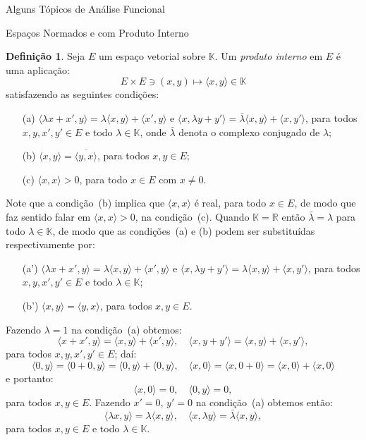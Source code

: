 \documentclass[oneside,final,11pt]{amsbook}
\newcommand{\R}{\mathds R}
\newcommand{\K}{\mathds K}
\theoremstyle{remark}\newtheorem{exercise}{Exercício}[chapter]
\theoremstyle{remark}\newtheorem{*exercise}[exercise]{\hbox to 0pt{\hskip 0pt minus 1fil*}Exercício}
\theoremstyle{definition}\newtheorem{exdefin}{Definição}[chapter]
\theoremstyle{plain}\newtheorem{teo}{Teorema}[section]
\theoremstyle{plain}\newtheorem{lem}[teo]{Lema}
\theoremstyle{plain}\newtheorem{prop}[teo]{Proposição}
\theoremstyle{plain}\newtheorem{cor}[teo]{Corolário}
\theoremstyle{definition}\newtheorem{defin}[teo]{Definição}
\theoremstyle{remark}\newtheorem{rem}[teo]{Observação}
\theoremstyle{definition}\newtheorem{notation}[teo]{Notação}
\theoremstyle{definition}\newtheorem{convention}[teo]{Convenção}
\theoremstyle{definition}\newtheorem{example}[teo]{Exemplo}
\numberwithin{section}{chapter}
\numberwithin{equation}{section}
\begin{document}
\begin{chapter}{Alguns Tópicos de Análise Funcional}
\begin{section}{Espaços Normados e com Produto Interno}
\begin{defin}
Seja $E$ um espaço vetorial sobre $\K$. Um {\em produto interno\/} em $E$ é uma
aplicação:\index[simbolos]{$\langle\cdot,\cdot\rangle$}
\[E\times E\ni(x,y)\longmapsto\langle x,y\rangle\in\K\]
satisfazendo as seguintes condições:
\begin{itemize}
\item[(a)] $\langle\lambda x+x',y\rangle=\lambda\langle x,y\rangle+\langle x',y\rangle$
e $\langle x,\lambda y+y'\rangle=\bar\lambda\langle x,y\rangle+\langle x,y'\rangle$, para todos
$x,y,x',y'\in E$ e todo $\lambda\in\K$, onde $\bar\lambda$ denota o complexo conjugado de $\lambda$;
\item[(b)] $\langle x,y\rangle=\overline{\langle y,x\rangle}$, para todos $x,y\in E$;
\item[(c)] $\langle x,x\rangle>0$, para todo $x\in E$ com $x\ne0$.
\end{itemize}
\end{defin}
Note que a condição~(b) implica que $\langle x,x\rangle$ é real, para todo $x\in E$, de modo que faz sentido
falar em $\langle x,x\rangle>0$, na condição~(c). Quando $\K=\R$ então $\bar\lambda=\lambda$ para todo $\lambda\in\K$,
de modo que as condições~(a) e (b) podem ser substituídas respectivamente por:
\begin{itemize}
\item[(a')] $\langle\lambda x+x',y\rangle=\lambda\langle x,y\rangle+\langle x',y\rangle$
e $\langle x,\lambda y+y'\rangle=\lambda\langle x,y\rangle+\langle x,y'\rangle$, para todos
$x,y,x',y'\in E$ e todo $\lambda\in\K$;
\item[(b')] $\langle x,y\rangle=\langle y,x\rangle$, para todos $x,y\in E$.
\end{itemize}
Fazendo $\lambda=1$ na condição~(a) obtemos:
\[\langle x+x',y\rangle=\langle x,y\rangle+\langle x',y\rangle,\quad
\langle x,y+y'\rangle=\langle x,y\rangle+\langle x,y'\rangle,\]
para todos $x,y,x',y'\in E$; daí:
\[\langle0,y\rangle=\langle0+0,y\rangle=\langle0,y\rangle+\langle0,y\rangle,\quad
\langle x,0\rangle=\langle x,0+0\rangle=\langle x,0\rangle+\langle x,0\rangle\]
e portanto:
\[\langle x,0\rangle=0,\quad\langle 0,y\rangle=0,\]
para todos $x,y\in E$. Fazendo $x'=0$, $y'=0$ na condição~(a) obtemos então:
\[\langle\lambda x,y\rangle=\lambda\langle x,y\rangle,\quad\langle x,\lambda y\rangle=\bar\lambda\langle x,y\rangle,\]
para todos $x,y\in E$ e todo $\lambda\in\K$.


\end{section}
\end{chapter}
\end{document}
